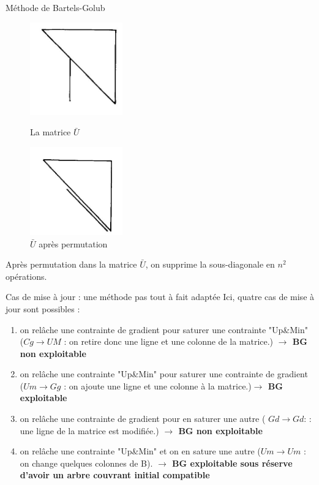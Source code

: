 \documentclass{beamer}
\begin{document}
\begin{frame}{Méthode de Bartels-Golub}
\begin{figure}[H]
\centering
    \begin{minipage}[c]{.46\linewidth}
    \includegraphics[width=4cm]{matricepic.JPG}
    \caption{La matrice $\bar{U}$}
    \label{fig:pic}
    \end{minipage} \hfill
    \begin{minipage}[c]{.46\linewidth}
    \includegraphics[width = 4cm]{bartelgolub.JPG}
    \caption{$\bar{U}$ après permutation}
    \label{fig:Bartelsgolub}
    \end{minipage} \hfill
\end{figure}

Après permutation dans la matrice $\bar{U}$, on supprime la sous-diagonale en $n^2$ opérations. 

\insertframenumber\end{frame}

\begin{frame}{Cas de mise à jour : une méthode pas tout à fait adaptée}
    Ici, quatre cas de mise à jour sont possibles : \begin{enumerate}
    \item on relâche une contrainte de gradient pour saturer une contrainte "Up\&Min" ($Cg \rightarrow UM$ : on retire donc une ligne et une colonne de la matrice.) \pause \textbf{$\rightarrow$ BG non exploitable}\pause
    \item on relâche une contrainte "Up\&Min" pour saturer une contrainte de gradient ($Um \rightarrow Gg$ : on ajoute une ligne et une colonne à la matrice.)\pause \textbf{$\rightarrow$ BG exploitable} \pause
    \item on relâche une contrainte de gradient pour en saturer une autre ( $Gd \rightarrow Gd$: : une ligne de la matrice est modifiée.) \pause \textbf{$\rightarrow$ BG non exploitable}\pause
    \item on relâche une contrainte "Up\&Min" et on en sature une autre ($Um \rightarrow Um$ : on change quelques colonnes de B). \pause \textbf{$\rightarrow$ BG exploitable sous réserve d'avoir un arbre couvrant initial compatible}
\end{enumerate}
\insertframenumber
\end{frame}
\end{document}
